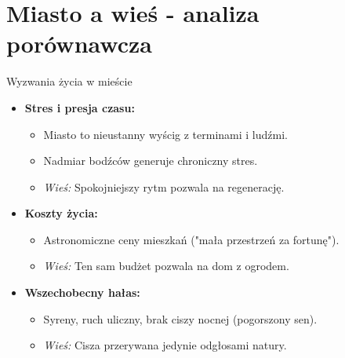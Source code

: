 \section{Miasto a wieś - analiza porównawcza}

\begin{frame}{Wyzwania życia w mieście \cite{link2}}
    \begin{itemize}
        \item \textbf{Stres i presja czasu:}
        \begin{itemize}
            \item Miasto to nieustanny wyścig z terminami i ludźmi.
            \item Nadmiar bodźców generuje chroniczny stres.
            \item \textit{Wieś:} Spokojniejszy rytm pozwala na regenerację.
        \end{itemize}
        
        \item \textbf{Koszty życia:}
        \begin{itemize}
            \item Astronomiczne ceny mieszkań ("mała przestrzeń za fortunę").
            \item \textit{Wieś:} Ten sam budżet pozwala na dom z ogrodem.
        \end{itemize}

        \item \textbf{Wszechobecny hałas:}
        \begin{itemize}
            \item Syreny, ruch uliczny, brak ciszy nocnej (pogorszony sen).
            \item \textit{Wieś:} Cisza przerywana jedynie odgłosami natury.
        \end{itemize}
    \end{itemize}
\end{frame}


